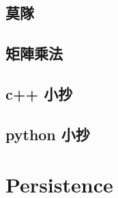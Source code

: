 \subsection{莫隊}

\subsection{矩陣乘法}

\subsection{c++ 小抄}

\subsection{python 小抄}


\section{Persistence}

